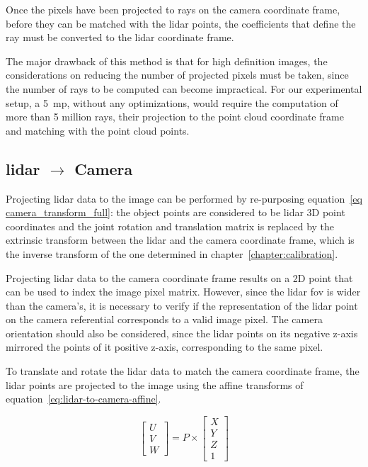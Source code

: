 Once the pixels have been projected to rays on the camera coordinate frame, before they can be matched with the \ac{lidar} points, the coefficients that define the ray must be converted to the \ac{lidar} coordinate frame.

The major drawback of this method is that for high definition images, the considerations on reducing the number of projected pixels must be taken, since the number of rays to be computed can become impractical. For our experimental setup, a 5~\ac{mp}, without any optimizations, would require the computation of more than 5 million rays, their projection to the point cloud coordinate frame and matching with the point cloud points.


\subsection{\ac{lidar} $\rightarrow$ Camera}
Projecting \ac{lidar} data to the image can be performed by re-purposing equation~\ref{eq camera_transform_full}: the object points are considered to be \ac{lidar} 3D point coordinates and the joint rotation and translation matrix is replaced by the extrinsic transform between the \ac{lidar} and the camera coordinate frame, which is the inverse transform of the one determined in chapter~\ref{chapter:calibration}.

Projecting \ac{lidar} data to the camera coordinate frame results on a 2D point that can be used to index the image pixel matrix. However, since the \ac{lidar} \ac{fov} is wider than the camera's, it is necessary to verify if the representation of the \ac{lidar} point on the camera referential corresponds to a valid image pixel. The camera orientation should also be considered, since the \ac{lidar} points on its negative z-axis mirrored the points of it positive z-axis, corresponding to the same pixel.

To translate and rotate the \ac{lidar} data to match the camera coordinate frame, the \ac{lidar} points are projected to the image using the affine transforms of equation~\ref{eq:lidar-to-camera-affine}. 

\begin{equation}
	\label{eq:lidar-to-camera-affine}
		\begin{bmatrix}
			U \\
			V \\
			W
		\end{bmatrix}
		= P \times
		\begin{bmatrix}
			X \\
			Y \\
			Z \\
			1
		\end{bmatrix}
\end{equation}


